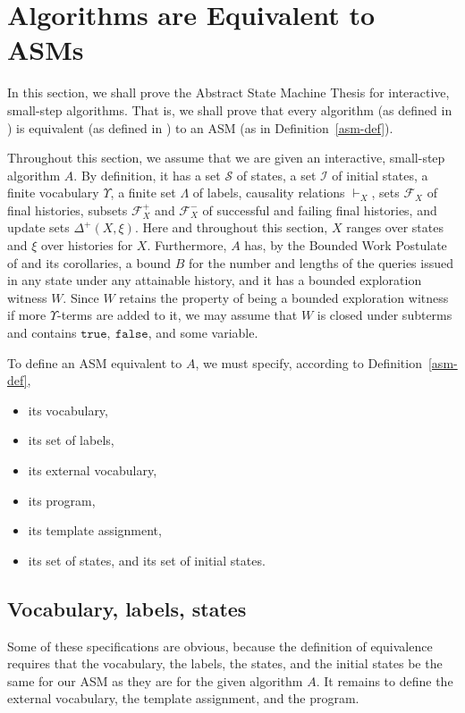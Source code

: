 \documentclass{LMCS}
\theoremstyle{definition}
\newcommand{\DD}{\Delta^+}
\newcommand{\U}{\Upsilon}
\newcommand{\scr}[1]{\ensuremath{\mathcal {#1}}}
\newcommand{\ttt}[1]{\ensuremath{\mathtt {#1}}}
\begin{document}
\section{Algorithms are Equivalent to ASMs}   \label{sec:thesis}

In this section, we shall prove the Abstract State Machine Thesis for
interactive, small-step algorithms.  That is, we shall prove that
every algorithm (as defined in \cite[Section~3]{ga1}) is equivalent
(as defined in \cite[Section~4]{ga1}) to an ASM (as in
Definition~\ref{asm-def}).

Throughout this section, we assume that we are given an interactive,
small-step algorithm $A$.  By definition, it has a set \scr S of
states, a set \scr I of initial states, a finite vocabulary
$\U$, a finite set $\Lambda$ of labels, causality relations
$\vdash_X$, sets $\scr F_X$ of final histories, subsets $\scr F_X^+$
and $\scr F_X^-$ of successful and failing final histories, and
update sets $\DD(X,\xi)$.  Here and throughout this section, $X$
ranges over states and $\xi$ over histories for $X$.  Furthermore,
$A$ has, by the Bounded Work Postulate of \cite{ga1} and its
corollaries, a bound $B$ for the number and lengths of the queries
issued in any state under any attainable history, and it has a
bounded exploration witness $W$. Since $W$ retains the property of
being a bounded exploration witness if more $\U$-terms are
added to it, we may assume that $W$ is closed under subterms and
contains \ttt{true,\ false}, and some variable.

To define an ASM equivalent to $A$, we must specify, according to
Definition~\ref{asm-def},
\begin{itemize}
\item its vocabulary,
\item its set of labels,
\item its external vocabulary,
\item its program,
\item its template assignment,
\item its set of states, and its set of initial states.
\end{itemize}

\subsection{Vocabulary, labels, states}

Some of these specifications are obvious, because the definition of
equivalence requires that the vocabulary, the labels, the states, and
the initial states be the same for our ASM as they are for the given
algorithm $A$. It remains to define the external vocabulary, the
template assignment, and the program.
\end{document}
